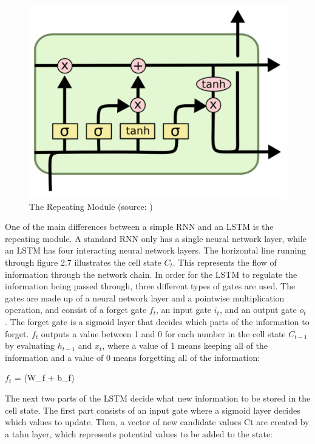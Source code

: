 \indent\newline 
\begin{figure}[H]
\centering
\includegraphics [scale=0.40,angle=360]{figures/module.png}
\caption{The Repeating Module (source: \cite{olah})}
\label{fig:module}
\end{figure}

\indent\newline 
One of the main differences between a simple RNN and an LSTM is the repeating module. A standard RNN only has a single neural network layer, while an LSTM has four interacting neural network layers. The horizontal line running through figure 2.7 illustrates the cell state $C_{t}$. This represents the flow of information through the network chain. In order for the LSTM to regulate the information being passed through, three different types of gates are used. The gates are made up of a neural network layer and a pointwise multiplication operation, and consist of a forget gate $f_{t}$, an input gate $i_{t}$, and an output gate $o_{t}$ \cite{olah}. The forget gate is a sigmoid layer that decides which parts of the information to forget. $f_{t}$ outputs a value between 1 and 0 for each number in the cell state $C_{t-1}$ by evaluating $h_{t-1}$ and $x_{t}$, where a value of 1 means keeping all of the information and a value of 0 means forgetting all of the information:

\indent\newline 
$f_{t}$ = \sigma(W_{f} \cdot[h_{t-1},x_{t}] + b_{f})

\indent\newline 
The next two parts of the LSTM decide what new information to be stored in the cell state. The first part consists of an input gate where a sigmoid layer decides which values to update\cite{olah}. Then, a vector of new candidate values Ct are created by a tahn layer, which represents potential values to be added to the state:


